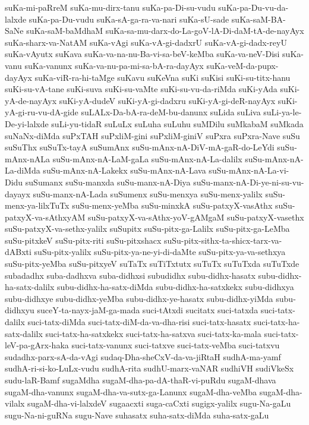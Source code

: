 {suKa-mi-paRreM
suKa-mu-dirx-tanu
suKa-pa-Di-su-vudu
suKa-pa-Du-vu-da-lalxde
suKa-pa-Du-vudu
suKa-sA-ga-ra-va-nari
suKa-sU-sade
suKa-saM-BA-SaNe
suKa-saM-baMdhaM
suKa-sa-mu-darx-do-La-goV-lA-Di-daM-tA-de-nayAyx
suKa-sharx-va-NatAM
suKa-vAgi
suKa-vA-gi-dadxrU
suKa-vA-gi-dadx-reyU
suKa-vAyutx
suKava
suKa-va-na-nu-Ba-vi-sa-beV-keMba
suKa-va-neV-Disi
suKa-vanu
suKa-vanunx
suKa-va-nu-pa-mi-sa-bA-ra-dayAyx
suKa-veM-da-pupx-dayAyx
suKa-viR-ra-hi-taMge
suKavu
suKeVna
suKi
suKisi
suKi-su-titx-hanu
suKi-su-vA-tane
suKi-suva
suKi-su-vaMte
suKi-su-vu-da-riMda
suKi-yAda
suKi-yA-de-nayAyx
suKi-yA-dudeV
suKi-yA-gi-dadxru
suKi-yA-gi-deR-nayAyx
suKi-yA-gi-ru-vu-dA-gide
suLALx-Da-bA-ra-deM-bu-danunx
suLida
suLiva
suLi-ya-le-De-yi-lalxde
suLi-yu-tidaR
suLuLx
suLuha
suLuhu
suMDilu
suMkabaM
suMkada
suNaNx-diMda
suPxTAH
suPxliM-gini
suPxliM-giniV
suPxra
suPxra-Nave
suSu
suSuThx
suSuTx-tayA
suSumAnx
suSu-mAnx-nA-DiV-mA-gaR-do-LeYdi
suSu-mAnx-nALa
suSu-mAnx-nA-LaM-gaLa
suSu-mAnx-nA-La-dalilx
suSu-mAnx-nA-La-diMda
suSu-mAnx-nA-Lakekx
suSu-mAnx-nA-Lava
suSu-mAnx-nA-La-vi-Didu
suSumanx
suSu-manxda
suSu-manx-nA-Diya
suSu-manx-nA-Di-ye-ni-su-vu-dayayx
suSu-manx-nA-Lada
suSumenx
suSu-menxya
suSu-menx-yalilx
suSu-menx-ya-lilxTuTx
suSu-menx-yeMba
suSu-minxkA
suSu-patxyX-vasAthx
suSu-patxyX-va-sAthxyAM
suSu-patxyX-va-sAthx-yoV-gAMgaM
suSu-patxyX-vasethx
suSu-patxyX-va-sethx-yalilx
suSupitx
suSu-pitx-ga-Lalilx
suSu-pitx-ga-LeMba
suSu-pitxkeV
suSu-pitx-riti
suSu-pitxshacx
suSu-pitx-sithx-ta-shicx-tarx-va-dABxti
suSu-pitx-yalilx
suSu-pitx-ya-ne-yi-di-daMte
suSu-pitx-ya-va-sethxya
suSu-pitx-yeMba
suSu-pitxyeV
suTaTx
suTiTxtutx
suTuTx
suTuTxda
suTuTxde
subadadhx
suba-dadhxva
suba-didhxsi
subudidhx
subu-didhx-hasatx
subu-didhx-ha-satx-dalilx
subu-didhx-ha-satx-diMda
subu-didhx-ha-satxkekx
subu-didhxya
subu-didhxye
subu-didhx-yeMba
subu-didhx-ye-hasatx
subu-didhx-yiMda
subu-didhxyu
suceY-ta-nayx-jaM-ga-mada
suci-tAtxdi
sucitatx
suci-tatxda
suci-tatx-dalilx
suci-tatx-diMda
suci-tatx-diM-da-va-dha-risi
suci-tatx-hasatx
suci-tatx-ha-satx-dalilx
suci-tatx-ha-satxkekx
suci-tatx-ha-satxva
suci-tatx-ka-mala
suci-tatx-leV-pa-gArx-haka
suci-tatx-vanunx
suci-tatxve
suci-tatx-veMba
suci-tatxvu
sudadhx-parx-sA-da-vAgi
sudaq-Dha-sheCxV-da-va-jiRtaH
sudhA-ma-yamf
sudhA-ri-si-ko-LuLx-vudu
sudhA-rita
sudhU-marx-vaNAR
sudhiVH
sudiVkeSx
sudu-laR-Bamf
sugaMdha
sugaM-dha-pa-dA-thaR-vi-puRdu
sugaM-dhava
sugaM-dha-vanunx
sugaM-dha-va-sutx-ga-Lanunx
sugaM-dha-veMba
sugaM-dha-vilalx
sugaM-dha-vi-lalxdeV
sugaacxti
suga-caCxti
sugigx-yalilx
sugu-Na-gaLu
sugu-Na-ni-guRNa
sugu-Nave
suhasatx
suha-satx-diMda
suha-satx-gaLu
}
